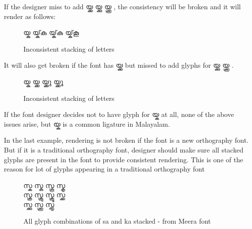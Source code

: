\begin{enumerate}
If the designer miss to add {\meera യ്ക്ക യ്ക്കു യ്ക്കൂ }, the consistency will 
be broken and it will render as follows:
\begin{figure}[h]
  \centering
  {\meera\textexample യ്ക യ്ക്‌ക യ്ക്‌കു യ്ക്‌കൂ }\\
  \caption{Inconsistent stacking of letters}
\end{figure}

It will also get broken if the font has  {\meera യ്ക്ക} but missed to add 
glyphs for {\meera യ്ക്കു യ്ക്കൂ }.

\begin{figure}[h]
  \centering
  {\meera\textexample യ്ക യ്ക്ക യ്ക്ക‌ു യ്ക്ക‌ൂ }\\
  \caption{Inconsistent stacking of letters}
\end{figure}

If the font designer decides not to have glyph for {\meera യ്ക } at  all, none
of the above issues arise, but  {\meera യ്ക } is a common ligature in Malayalam.

In the last example, rendering is not broken if the font is a new orthography
font. But if it is a traditional orthography font, designer should make sure all
stacked glyphs are present in the font to provide consistent rendering. This is
one of the reason for lot of glyphs appearing in a traditional orthography font

\begin{figure}[h]
  \centering
  {\meera\textexample സ്ക സ്കു സ്കൂ സ്കൃ \\ സ്ക്ര സ്ക്രു സ്ക്രൂ സ്ക്ക \\ സ്ക്കു സ്ക്കൂ സ്ക്കൃ }\\
  \caption{All glyph combinations of sa and ka stacked - from Meera font}
\end{figure}

\end{enumerate}
